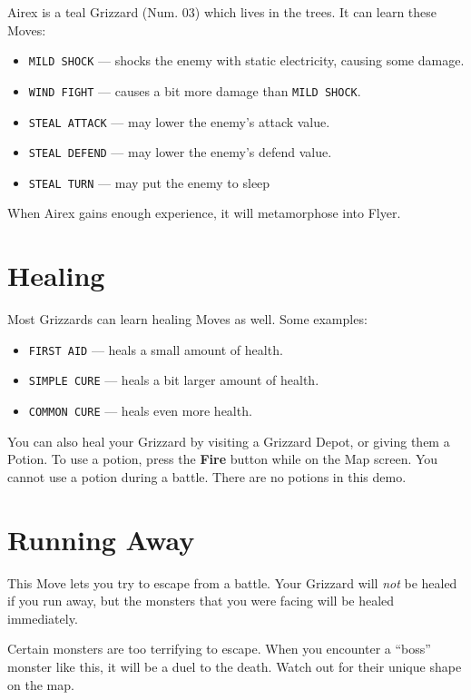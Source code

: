 \documentclass[10pt,twocolumn,openany,article]{memoir}
\begin{document}
Airex is  a teal  Grizzard (Num. 03)  which lives in  the trees.  It can
learn these Moves:

\begin{itemize}
\item \texttt{MILD SHOCK} --- shocks  the enemy with static electricity,
  causing some damage.
\item \texttt{WIND FIGHT} --- causes a bit more damage than \texttt{MILD SHOCK}.
\item \texttt{STEAL ATTACK} --- may lower the enemy's attack value.
\item \texttt{STEAL DEFEND} --- may lower the enemy's defend value.
\item \texttt{STEAL TURN} --- may put the enemy to sleep
\end{itemize}

When Airex gains enough experience, it will metamorphose into Flyer.

\fi

\pagebreak

\section{Healing}

Most Grizzards can learn healing Moves as well. Some examples:

\begin{itemize}
\item \texttt{FIRST AID} --- heals a small amount of health.
\item \texttt{SIMPLE CURE} --- heals a bit larger amount of health.
\item \texttt{COMMON CURE} --- heals even more health.
\end{itemize}

You can also heal your Grizzard  by visiting a Grizzard Depot, or giving
them a Potion. To use a  potion, press the \textbf{Fire} button while on
the Map screen. You cannot use a potion during a battle. \ifdefined\DEMO
There are no potions in this demo. \fi

\section{Running Away}

This  Move lets  you try  to escape  from a  battle. Your  Grizzard will
\emph{not} be  healed if you  run away, but  the monsters that  you were
facing will be healed immediately.

Certain  monsters  are too  terrifying  to  escape. When  you  encounter
a ``boss'' monster like this, it will  be a duel to the death. Watch out
for their unique shape on the map.
\end{document}
